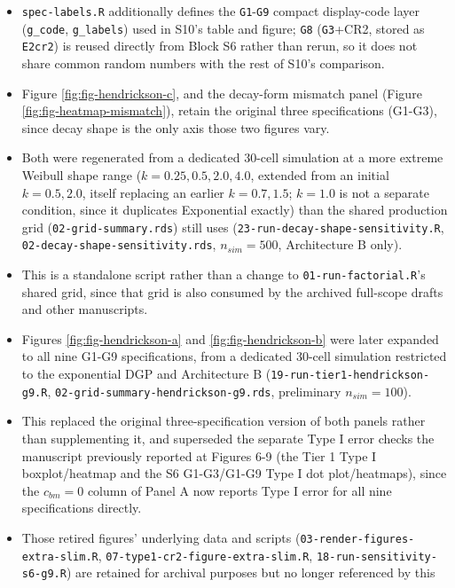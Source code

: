 \documentclass[
  11pt,
]{article}
\begin{document}
\begin{itemize}
  pair, which they do not modify.
\item
  \texttt{spec-labels.R} additionally defines the \texttt{G1}-\texttt{G9} compact
  display-code layer (\texttt{g\_code}, \texttt{g\_labels}) used in S10's table and
  figure; \texttt{G8} (\texttt{G3}+CR2, stored as \texttt{E2cr2}) is reused directly from
  Block S6 rather than rerun, so it does not share common random
  numbers with the rest of S10's comparison.
\item
  Figure \ref{fig:fig-hendrickson-c}, and the decay-form mismatch
  panel (Figure \ref{fig:fig-heatmap-mismatch}), retain the original
  three specifications (G1-G3), since decay shape is the only axis
  those two figures vary.
\item
  Both were regenerated from a dedicated 30-cell simulation at a more
  extreme Weibull shape range (\(k = 0.25, 0.5, 2.0, 4.0\), extended
  from an initial \(k = 0.5, 2.0\), itself replacing an earlier \(k =
  0.7, 1.5\); \(k = 1.0\) is not a separate condition, since it
  duplicates Exponential exactly) than the shared production grid
  (\texttt{02-grid-summary.rds}) still uses
  (\texttt{23-run-decay-shape-sensitivity.R},
  \texttt{02-decay-shape-sensitivity.rds}, \(n_{sim} = 500\), Architecture B
  only).
\item
  This is a standalone script rather than a change to
  \texttt{01-run-factorial.R}'s shared grid, since that grid is also
  consumed by the archived full-scope drafts and other manuscripts.
\item
  Figures \ref{fig:fig-hendrickson-a} and
  \ref{fig:fig-hendrickson-b} were later expanded to all nine G1-G9
  specifications, from a dedicated 30-cell simulation restricted to
  the exponential DGP and Architecture B
  (\texttt{19-run-tier1-hendrickson-g9.R},
  \texttt{02-grid-summary-hendrickson-g9.rds}, preliminary \(n_{sim} = 100\)).
\item
  This replaced the original three-specification version of both
  panels rather than supplementing it, and superseded the separate
  Type I error checks the manuscript previously reported at Figures
  6-9 (the Tier 1 Type I boxplot/heatmap and the S6 G1-G3/G1-G9 Type
  I dot plot/heatmaps), since the \(c_{bm}=0\) column of Panel A now
  reports Type I error for all nine specifications directly.
\item
  Those retired figures' underlying data and scripts
  (\texttt{03-render-figures-extra-slim.R},
  \texttt{07-type1-cr2-figure-extra-slim.R}, \texttt{18-run-sensitivity-s6-g9.R})
  are retained for archival purposes but no longer referenced by this

\end{itemize}
\end{document}
